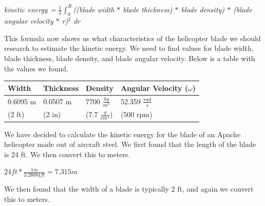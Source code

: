 \documentclass[a4paper, 11pt, oneside]{book} %
\begin{document}
\textit{kinetic energy = $\frac{1}{2} \int_{0}^{R}$((blade width $*$ blade thickness) $*$ blade density) $*$ (blade angular velocity $*$ r)$^2$ dr}

\vspace{0.5\baselineskip} %
\vspace{0.5\baselineskip} %

This formula now shows us what characteristics of the helicopter blade we should research to estimate the kinetic energy. We need to find values for blade width, blade thickness, blade density, and blade angular velocity. Below is a table with the values we found.\\

\begin{table}[!h]
\centering
\begin{tabular}{|l|l|l|l|}
\hline
Width    & Thickness & Density      & Angular Velocity ($\omega$) \\ \hline
0.6095 m & 0.0507 m  & 7700 $\frac{kg}{m^3}$  & 52.359 $\frac{rad}{s}$         \\ \hline
(2 ft)   & (2 in)    & (7.7 $\frac{g}{cm^3}$) & (500 rpm)            \\ \hline
\end{tabular}
\end{table}

\vspace{0.5\baselineskip} %
\vspace{0.5\baselineskip} %

We have decided to calculate the kinetic energy for the blade of an Apache helicopter made out of aircraft steel. We first found that the length of the blade is 24 ft. We then convert this to meters.

\vspace{0.5\baselineskip} %
\vspace{0.5\baselineskip} %

$24ft * \frac{1m}{3.28084ft} = 7.315m$\\

\vspace{0.5\baselineskip} %
\vspace{0.5\baselineskip} %

We then found that the width of a blade is typically 2 ft, and again we convert this to meters.\\
\end{document}
